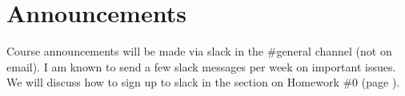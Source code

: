 
\section*{Announcements}

Course announcements will be made via slack in the \#general channel (not on email). I am known to send a few slack messages per week on important issues.  We will discuss how to sign up to slack in the section on Homework \#0 (page \pageref{subsec:homework_zero}).
